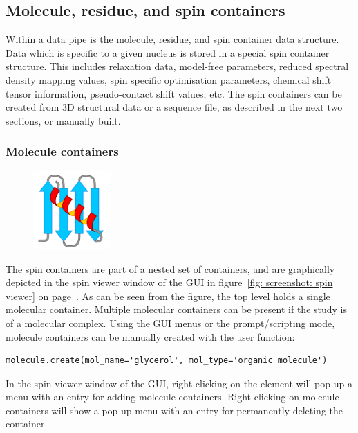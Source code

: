 
\subsection{Molecule, residue, and spin containers}

Within a data pipe is the molecule, residue, and spin container data structure.
Data which is specific to a given nucleus is stored in a special spin container structure.
This includes relaxation data, model-free parameters, reduced spectral density mapping values, spin specific optimisation parameters, chemical shift tensor information, pseudo-contact shift values, etc.
The spin containers can be created from 3D structural data or a sequence file, as described in the next two sections, or manually built.



\subsubsection{Molecule containers}

\begin{figure}[h]
  \includegraphics[width=3cm, bb=0 0 1701 1701]{graphics/misc/molecule_600x600}
\end{figure}

The spin containers are part of a nested set of containers, and are graphically depicted in the spin viewer window of the GUI in figure~\ref{fig: screenshot: spin viewer} on page~\pageref{fig: screenshot: spin viewer}.
As can be seen from the figure, the top level holds a single molecular container.
Multiple molecular containers can be present if the study is of a molecular complex.
Using the GUI menus or the prompt/scripting mode, molecule containers can be manually created with the user function:

\begin{lstlisting}
molecule.create(mol_name='glycerol', mol_type='organic molecule')
\end{lstlisting}

In the spin viewer window of the GUI, right clicking on the  element will pop up a menu with an entry for adding molecule containers.
Right clicking on molecule containers will show a pop up menu with an entry for permanently deleting the container.



